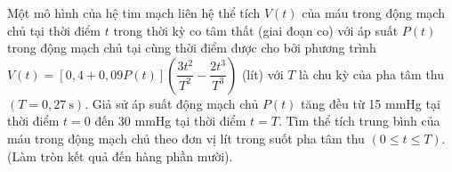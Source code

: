 \begin{ex}%
	Một mô hình của hệ tim mạch liên hệ thể tích $V(t)$ của máu trong động mạch chủ tại thời điểm $t$ trong thời kỳ co tâm thất (giai đoạn co) với áp suất $P(t)$ trong động mạch chủ tại cùng thời điểm được cho bởi phương trình $V(t)=[0{,}4+0{,}09 P(t)]\left(\dfrac{3 t^2}{T^2}-\dfrac{2 t^3}{T^3}\right)$
	(lít) với $T$ là chu kỳ của pha tâm thu $(T=0{,}27 \mathrm{~s})$. Giả sử áp suất động mạch chủ $P(t)$ tăng đều từ 15 mmHg tại thời điểm $t=0$ đến 30 mmHg tại thời điểm $t=T$. Tìm thể tích trung bình của máu trong động mạch chủ theo đơn vị lít trong suốt pha tâm thu $(0 \leq t \leq T)$. (Làm tròn kết quả đến hàng phần mười).
	\par{} \par
\end{ex}

